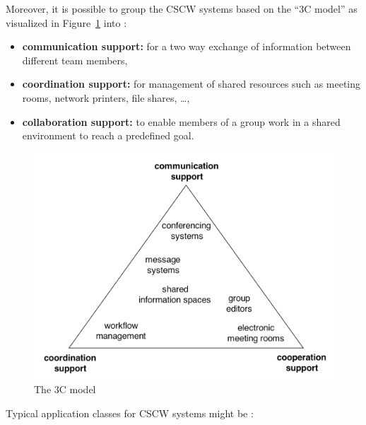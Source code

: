 Moreover, it is possible to group the \gls{CSCW} systems based on the ``3C model'' as visualized in Figure~\ref{fig:images_cscw_3C_model} into \citep[pg. 125]{borghoff2000computer}:

\begin{itemize}
  \item \textbf{communication support:} for a two way exchange of information between different team members,
  \item \textbf{coordination support:} for management of shared resources such as meeting rooms, network printers, file shares, \ldots,
  \item \textbf{collaboration support:} to enable members of a group work in a shared environment to reach a predefined goal.
\end{itemize}

\begin{figure}[H]
 \centering
 \includegraphics[width=0.9\columnwidth]{images/3C-model.png}
 \caption[The 3C model]{The 3C model \citep{Koch2008}}
\label{fig:images_cscw_3C_model}
\end{figure}

Typical application classes for \gls{CSCW} systems might be \citep[pg. 119-120]{borghoff2000computer}: \@

